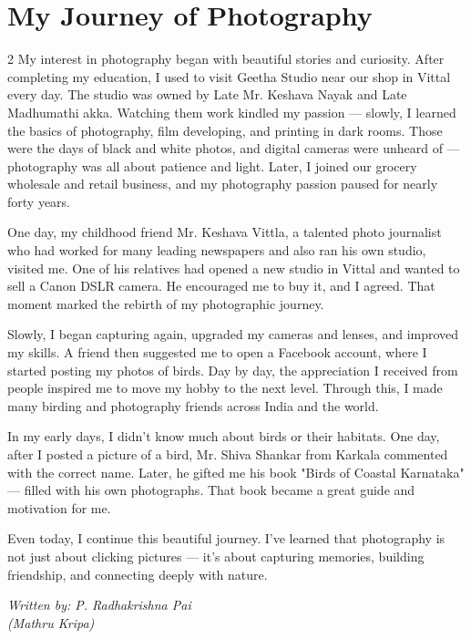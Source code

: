 \documentclass[12pt]{article}
\newcommand{\attribution}[1]{%
  \par\vspace{2em}%
  \begin{flushright}\itshape #1\end{flushright}%
}
\begin{document}
\section*{My Journey of Photography}
\begin{multicols}{2}
\noindent My interest in photography began with beautiful stories and curiosity. After completing my education, I used to visit Geetha Studio near our shop in Vittal every day. The studio was owned by Late Mr. Keshava Nayak and Late Madhumathi akka. Watching them work kindled my passion — slowly, I learned the basics of photography, film developing, and printing in dark rooms. Those were the days of black and white photos, and digital cameras were unheard of — photography was all about patience and light. Later, I joined our grocery wholesale and retail business, and my photography passion paused for nearly forty years.

One day, my childhood friend Mr. Keshava Vittla, a talented photo journalist who had worked for many leading newspapers and also ran his own studio, visited me. One of his relatives had opened a new studio in Vittal and wanted to sell a Canon DSLR camera. He encouraged me to buy it, and I agreed. That moment marked the rebirth of my photographic journey.

Slowly, I began capturing again, upgraded my cameras and lenses, and improved my skills. A friend then suggested me to open a Facebook account, where I started posting my photos of birds. Day by day, the appreciation I received from people inspired me to move my hobby to the next level. Through this, I made many birding and photography friends across India and the world.

In my early days, I didn't know much about birds or their habitats. One day, after I posted a picture of a bird, Mr. Shiva Shankar from Karkala commented with the correct name. Later, he gifted me his book "Birds of Coastal Karnataka" — filled with his own photographs. That book became a great guide and motivation for me.

Even today, I continue this beautiful journey. I've learned that photography is not just about clicking pictures — it's about capturing memories, building friendship, and connecting deeply with nature.

\end{multicols}
\attribution{Written by: P. Radhakrishna Pai\\(Mathru Kripa)}
\newpage
\end{document}
